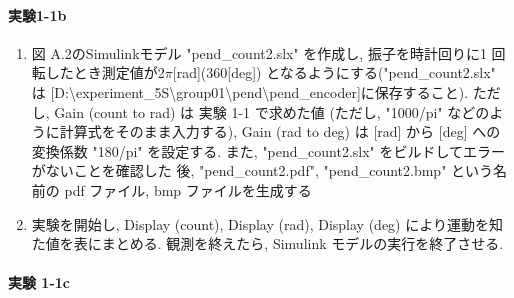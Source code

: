 \paragraph{実験1-1b}
\begin{enumerate}
  \item 図 A.2のSimulinkモデル "pend\_count2.slx" を作成し,
        振子を時計回りに1 回転したとき測定値が2\(\pi\)[rad](360[deg]) 
        となるようにする("pend\_count2.slx" は [D:\textbackslash experiment\_5S\textbackslash group01\textbackslash pend\textbackslash pend\_encoder]に保存すること). 
        ただし, Gain (count to rad) は 実験 1-1 で求めた値 
        (ただし, "1000/pi" などのように計算式をそのまま入力する), 
        Gain (rad to deg) は [rad] から [deg] への
        変換係数 "180/pi" を設定する. 
        また, "pend\_count2.slx" をビルドしてエラーがないことを確認した
        後, "pend\_count2.pdf", "pend\_count2.bmp" という名前の 
        pdf ファイル, bmp ファイルを生成する
        
  \item 実験を開始し, Display (count), Display (rad), Display (deg) により運動を知た値を表にまとめる.
        観測を終えたら, Simulink モデルの実行を終了させる.
\end{enumerate}

\paragraph{実験 1-1c}

